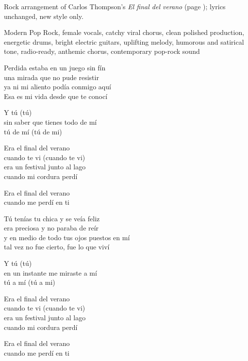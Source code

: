 
\begin{notes}
Rock arrangement of Carlos Thompson's \emph{El final del verano} (page \pageref{sec:verano}); lyrics unchanged, new style only.
\end{notes}
\begin{style}
Modern Pop Rock, female vocals, catchy viral chorus, clean polished production, energetic drums, bright electric guitars, uplifting melody, humorous and satirical tone, radio-ready, anthemic chorus, contemporary pop-rock sound
\end{style}
\begin{lyrics}
Perdida estaba en un juego sin fín\\
una mirada que no pude resistir\\
ya ni mi aliento podía conmigo aquí\\
Esa es mi vida desde que te conocí

Y tú (tú)\\
sin saber que tienes todo de mí\\
tú de mí (tú de mi)

Era el final del verano\\
cuando te vi (cuando te vi)\\
era un festival junto al lago\\
cuando mi cordura perdí

Era el final del verano\\
cuando me perdí en ti

Tú tenías tu chica y se veía feliz\\
era preciosa y no paraba de reír\\
y en medio de todo tus ojos puestos en mí\\
tal vez no fue cierto, fue lo que viví

Y tú (tú)\\
en un instante me miraste a mí\\
tú a mí (tú a mi)

Era el final del verano\\
cuando te vi (cuando te vi)\\
era un festival junto al lago\\
cuando mi cordura perdí

Era el final del verano\\
cuando me perdí en ti


\end{lyrics}
